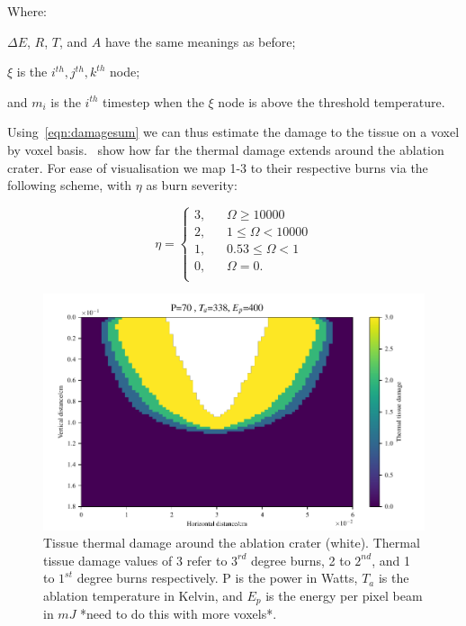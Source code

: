 \noindent Where: 
	
	\indent $\Delta E$, $R$, $T$, and $A$ have the same meanings as before;
	
	\indent $\xi$ is the $i^{th}, j^{th}, k^{th}$ node;
	
	\indent and $m_i$ is the $i^{th}$ timestep when the $\xi$ node is above the threshold temperature.

	\medskip
	
	Using~\cref{eqn:damagesum} we can thus estimate the damage to the tissue on a voxel by voxel basis.~ show how far the thermal damage extends around the ablation crater. For ease of visualisation we map 1-3 to their respective burns via the following scheme, with $\eta$ as burn severity:
	
\begin{equation}
\eta = 
     \begin{cases}
       \text{3,} &\quad \Omega \geq 10000\\
       \text{2,} &\quad 1 \leq \Omega < 10000\\
       \text{1,} &\quad 0.53 \leq \Omega < 1\\
       \text{0,} &\quad \Omega=0.\\
     \end{cases}
\label{eqn:thermalbound}
\end{equation}

\begin{figure}[!h]
	\centering
	\includegraphics[width=\columnwidth]{./ablation/images/damage-slice.pdf}
	\caption{Tissue thermal damage around the ablation crater (white). Thermal tissue damage values of 3 refer to $3^{rd}$ degree burns, 2 to $2^{nd}$, and 1 to $1^{st}$ degree burns respectively. P is the power in Watts, $T_a$ is the ablation temperature in Kelvin, and $E_p$ is the energy per pixel beam in $mJ$ *need to do this with more voxels*.}
	\label{fig:damfig}
\end{figure}
	
